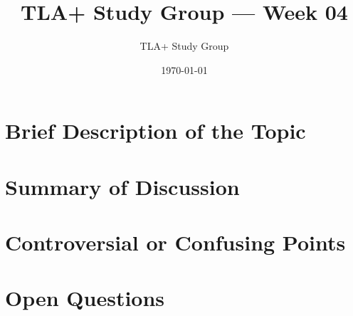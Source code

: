 \documentclass[11pt]{article}
\title{TLA+ Study Group — Week 04}
\author{TLA+ Study Group}
\date{\today}
\begin{document}
\maketitle

\section*{Brief Description of the Topic}

\section*{Summary of Discussion}

\section*{Controversial or Confusing Points}

\section*{Open Questions}
\end{document}
